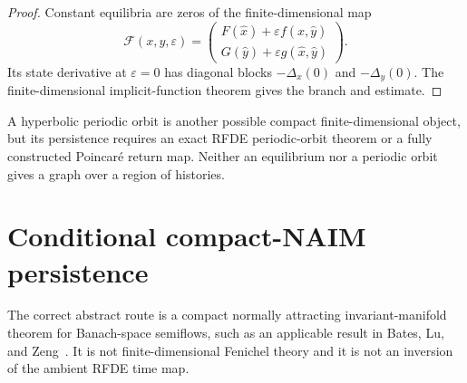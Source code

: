\documentclass[11pt]{article}
\theoremstyle{definition}
\theoremstyle{remark}
\begin{document}
\begin{proof}
Constant equilibria are zeros of the finite-dimensional map
\[
\mathcal F(x,y,\varepsilon)=
\begin{pmatrix}
F(\widehat x)+\varepsilon f(\widehat x,\widehat y)\\
G(\widehat y)+\varepsilon g(\widehat x,\widehat y)
\end{pmatrix}.
\]
Its state derivative at $\varepsilon=0$ has diagonal blocks $-\Delta_x(0)$ and $-\Delta_y(0)$. The finite-dimensional implicit-function theorem gives the branch and estimate.\qedhere
\end{proof}

A hyperbolic periodic orbit is another possible compact finite-dimensional object, but its persistence requires an exact RFDE periodic-orbit theorem or a fully constructed Poincar\'e return map. Neither an equilibrium nor a periodic orbit gives a graph over a region of histories.

\section{Conditional compact-NAIM persistence}
\label{sec:conditional}

The correct abstract route is a compact normally attracting invariant-manifold theorem for Banach-space semiflows, such as an applicable result in Bates, Lu, and Zeng~\cite{blz1998}. It is not finite-dimensional Fenichel theory and it is not an inversion of the ambient RFDE time map.
\end{document}
